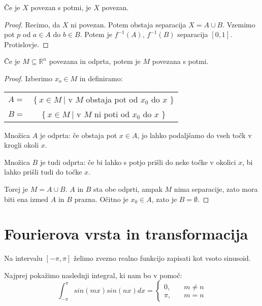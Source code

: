 \documentclass[11pt, a4paper]{article}
\begin{document}
    \begin{proposition}
        Če je \(X\) povezan s potmi, je \(X\) povezan.
    \end{proposition}

    \begin{proof}
        Recimo, da \(X\) ni povezan. Potem obstaja separacija \(X = A \cup B\). Vzemimo pot \(p\) od \(a \in A\) do \(b \in B\). Potem je \(f^{-1}(A)\), \(f^{-1}(B)\) separacija \([0,1]\). Protislovje.
    \end{proof}

    \begin{theorem}
        Če je \(M \subseteq \mathbb{R}^n\) povezana in odprta, potem je \(M\) povezana s potmi.
    \end{theorem}

    \begin{proof}
        Izberimo \(x_o \in M\) in definiramo:
        \begin{center}
            \begin{tabular}{c c}
                \(A=\) & \(\{\ x \in M\ | \) v \(M\) obstaja pot od \(x_0\) do \(x\) \(\}\) \\
               \(B=\) & \(\{\ x \in M\ | \) v \(M\) ni poti od \(x_0\) do \(x\) \(\}\) 
            \end{tabular}
            
        \end{center}

        Množica \(A\) je odprta: če obstaja pot \(x \in A\), jo lahko podaljšamo do vseh točk v krogli okoli \(x\).
        \par
        Množica \(B\) je tudi odprta: če bi lahko s potjo prišli do neke točke v okolici \(x\), bi lahko prišli tudi do točke \(x\).
        \par
        Torej je \(M = A \cup B\). \(A\) in \(B\) sta obe odprti, ampak \(M\) nima separacije, zato mora biti ena izmed \(A\) in \(B\) prazna. Očitno je \(x_0 \in A\), zato je \(B = \emptyset\).
    \end{proof}



    \section{Fourierova vrsta in transformacija}

    Na intervalu \([- \pi, \pi]\) želimo zvezno realno funkcijo zapisati kot vsoto sinusoid.
    
    \par
    Najprej pokažimo naslednji integral, ki nam bo v pomoč:
    \[\int_{- \pi}^{\pi} sin(mx) sin(nx) dx = 
        \begin{cases}
            0, & \quad{m \neq n} \\
            \pi, & \quad{m = n}
        \end{cases}
    \]
\end{document}
